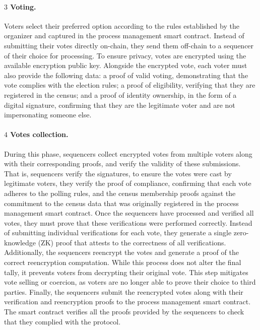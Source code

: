 \paragraph{$\boxed{3}$ Voting.}

Voters select their preferred option according to the rules established by the organizer and captured in the process management smart contract. Instead of submitting their votes directly on-chain, they send them off-chain to a sequencer of their choice for processing. To ensure privacy, votes are encrypted using the available encryption public key. Alongside the encrypted vote, each voter must also provide the following data: a proof of valid voting, demonstrating that the vote complies with the election rules; a proof of eligibility, verifying that they are registered in the census; and a proof of identity ownership, in the form of a digital signature, confirming that they are the legitimate voter and are not impersonating someone else. 

\paragraph{$\boxed{4}$ Votes collection.}

During this phase, sequencers collect encrypted votes from multiple voters along with their corresponding proofs, and verify the validity of these submissions. That is, sequencers
verify the signatures, to ensure the votes were cast by legitimate voters, they verify the proof of compliance, confirming that each vote adheres to the polling rules, and the census membership proofs against the commitment to the census data that was originally registered in the process management smart contract. Once the sequencers have processed and verified all votes, they must prove that these verifications were performed correctly. Instead of submitting individual verifications for each vote, they generate a single zero-knowledge (ZK) proof that attests to the correctness of all verifications.
Additionally, the sequencers reencrypt the votes and generate a proof of the correct reencryption computation. While this process does not alter the final tally, it prevents voters from decrypting their original vote. This step mitigates vote selling or coercion, as voters are no longer able to prove their choice to third parties. Finally, the sequencers submit the reencrypted votes along with their verification and reencryption proofs to the process management smart contract. The smart contract verifies all the proofs provided by the sequencers to check that they complied with the protocol.

